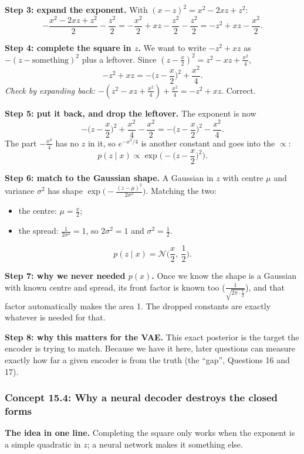 \documentclass[12pt,a4paper]{article}
\begin{document}
\textbf{Step 3: expand the exponent.} With $(x-z)^2=x^2-2xz+z^2$:
\[
-\frac{x^2-2xz+z^2}{2}-\frac{z^2}{2}=-\frac{x^2}{2}+xz-\frac{z^2}{2}-\frac{z^2}{2}=-z^2+xz-\frac{x^2}{2}.
\]

\textbf{Step 4: complete the square in $z$.} We want to write $-z^2+xz$ as $-(z-\text{something})^2$ plus a leftover. Since $(z-\frac x2)^2=z^2-xz+\frac{x^2}{4}$,
\[
-z^2+xz=-\Big(z-\frac x2\Big)^2+\frac{x^2}{4}.
\]
\emph{Check by expanding back:} $-(z^2-xz+\frac{x^2}{4})+\frac{x^2}{4}=-z^2+xz$. Correct.

\textbf{Step 5: put it back, and drop the leftover.} The exponent is now
\[
-\Big(z-\frac x2\Big)^2+\frac{x^2}{4}-\frac{x^2}{2}=-\Big(z-\frac x2\Big)^2-\frac{x^2}{4}.
\]
The part $-\frac{x^2}{4}$ has no $z$ in it, so $e^{-x^2/4}$ is another constant and goes into the $\propto$:
\[
p(z\mid x)\propto\exp\!\Big(-\Big(z-\frac x2\Big)^2\Big).
\]

\textbf{Step 6: match to the Gaussian shape.} A Gaussian in $z$ with centre $\mu$ and variance $\sigma^2$ has shape $\exp\!\big(-\frac{(z-\mu)^2}{2\sigma^2}\big)$. Matching the two:
\begin{itemize}[nosep]
  \item the centre: $\mu=\frac x2$;
  \item the spread: $\frac{1}{2\sigma^2}=1$, so $2\sigma^2=1$ and $\sigma^2=\frac12$.
\end{itemize}
\[
p(z\mid x)=\mathcal{N}\!\Big(\frac x2,\ \frac12\Big).
\]

\textbf{Step 7: why we never needed $p(x)$.} Once we know the shape is a Gaussian with known centre and spread, its front factor is known too ($\frac{1}{\sqrt{2\pi\cdot\frac12}}$), and that factor automatically makes the area 1. The dropped constants are exactly whatever is needed for that.

\textbf{Step 8: why this matters for the VAE.} This exact posterior is the target the encoder is trying to match. Because we have it here, later questions can measure exactly how far a given encoder is from the truth (the ``gap'', Questions 16 and 17).

\subsubsection{Concept 15.4: Why a neural decoder destroys the closed forms}\label{c15-4}

\textbf{The idea in one line.} Completing the square only works when the exponent is a simple quadratic in $z$; a neural network makes it something else.
\end{document}
